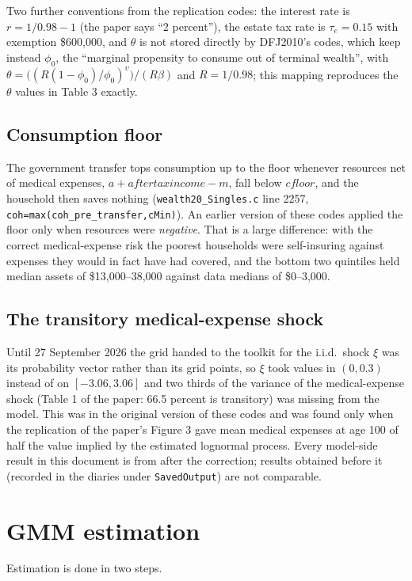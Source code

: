\documentclass[11pt,fleqn]{article}
\begin{document}
Two further conventions from the replication codes: the interest rate is $r=1/0.98-1$ (the paper says ``2 percent''), the estate tax rate is $\tau_e=0.15$ with exemption \$600,000, and $\theta$ is not stored directly by DFJ2010's codes, which keep instead $\phi_0$, the ``marginal propensity to consume out of terminal wealth'', with $\theta=\big((R(1-\phi_0)/\phi_0)^{\upsilon}\big)/(R\beta)$ and $R=1/0.98$; this mapping reproduces the $\theta$ values in Table 3 exactly.

\subsection{Consumption floor}
The government transfer tops consumption up to the floor whenever resources net of medical expenses, $a+aftertaxincome-m$, fall below $cfloor$, and the household then saves nothing (\texttt{wealth20\_Singles.c} line 2257, \texttt{coh=max(coh\_pre\_transfer,cMin)}). An earlier version of these codes applied the floor only when resources were \emph{negative}. That is a large difference: with the correct medical-expense risk the poorest households were self-insuring against expenses they would in fact have had covered, and the bottom two quintiles held median assets of \$13,000--38,000 against data medians of \$0--3,000.

\subsection{The transitory medical-expense shock}
Until 27 September 2026 the grid handed to the toolkit for the i.i.d.\ shock $\xi$ was its probability vector rather than its grid points, so $\xi$ took values in $(0,0.3)$ instead of on $[-3.06,3.06]$ and two thirds of the variance of the medical-expense shock (Table 1 of the paper: 66.5 percent is transitory) was missing from the model. This was in the original version of these codes and was found only when the replication of the paper's Figure 3 gave mean medical expenses at age 100 of half the value implied by the estimated lognormal process. Every model-side result in this document is from after the correction; results obtained before it (recorded in the diaries under \texttt{SavedOutput}) are not comparable.

\section{GMM estimation}\label{sec:gmm}
Estimation is done in two steps.
\end{document}
